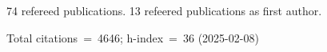 74 refereed publications. 13 refeered publications as first author.

Total citations~=~4646; h-index~=~36 (2025-02-08)